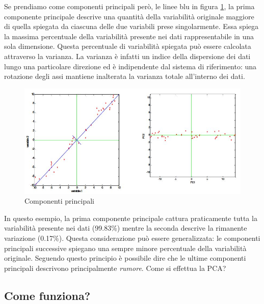 \documentclass[12pt]{article}
\begin{document}
		Se prendiamo come componenti principali però, le linee blu in figura \ref{fig:componenti}, la prima componente principale descrive una quantità della variabilità originale maggiore di quella spiegata da ciascuna delle due variabili prese singolarmente. Essa spiega la massima percentuale della variabilità presente nei dati rappresentabile in una sola dimensione. Questa percentuale di variabilità spiegata può essere calcolata attraverso la varianza. La varianza è infatti un indice della dispersione dei dati lungo una particolare direzione ed è indipendente dal sistema di riferimento: una rotazione degli assi mantiene inalterata la varianza totale all’interno dei dati. 
		\begin{figure}[H]
			\begin{center}
				\includegraphics[scale=.6]{componenti}
				\caption{Componenti principali}
				\label{fig:componenti}
			\end{center}
		\end{figure}
		In questo esempio, la prima componente principale cattura praticamente tutta la variabilità presente nei dati (99.83\%) mentre la seconda descrive la rimanente variazione (0.17\%). Questa considerazione può essere generalizzata: le componenti principali successive spiegano una sempre minore percentuale della variabilità originale. Seguendo questo principio è possibile dire che le ultime componenti principali descrivono principalmente \emph{rumore}. Come si effettua la \ac{PCA}?
		
	\subsection{Come funziona?}
			
\end{document}
